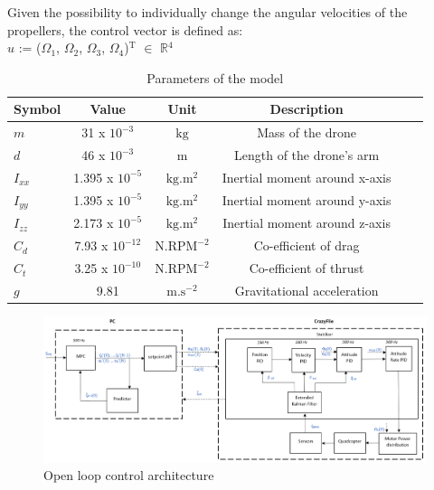 \documentclass[conference]{IEEEtran}
\begin{document}
Given the possibility to individually change the angular velocities of the propellers, the control vector is defined as: \\                          
$u$ := ($\Omega_{1}$, $\Omega_{2}$, $\Omega_{3}$, $\Omega_{4}$)$\mathrm{^{T}}$ $\in$ $\mathbb{R}\mathrm{^{4}}$

\begin{table}[htbp]\label{table1}
	\caption{Parameters of the model}
	\begin{center}
		\begin{tabular}{lccccl}\toprule
            \hline
			\textbf{Symbol} & \textbf{Value} & \textbf{Unit} & \textbf{Description}\\\midrule
			\hline
            $m$ & 31 x $\mathrm{10^{-3}}$ & $\mathrm{kg}$ & Mass of the drone \\
			$d$ & 46 x $\mathrm{10^{-3}}$ & $\mathrm{m}$ & Length of the drone's arm \\
			$I_{xx}$ & 1.395 x $\mathrm{10^{-5}}$ & $\mathrm{kg.m^2}$ & Inertial moment around x-axis \\
            $I_{yy}$ & 1.395 x $\mathrm{10^{-5}}$ & $\mathrm{kg.m^2}$ & Inertial moment around y-axis \\
            $I_{zz}$ & 2.173 x $\mathrm{10^{-5}}$ & $\mathrm{kg.m^2}$ & Inertial moment around z-axis \\
            $C_d$ & 7.93 x $\mathrm{10^{-12}}$ & $\mathrm{N.RPM^{-2}}$ & Co-efficient of drag\\
			$C_t$ & 3.25 x $\mathrm{10^{-10}}$ & $\mathrm{N.RPM^{-2}}$ & Co-efficient of thrust \\
			$g$ & 9.81 & $\mathrm{m.s^{-2}}$ & Gravitational acceleration \\\bottomrule
			\hline
		\end{tabular}
	\end{center}
\end{table}

\begin{figure}[htbp]
	\centerline{\includegraphics[scale = 0.6]{figures/Screenshot_OL.png} }
	\caption{Open loop control architecture }
	\label{Fig2}
\end{figure}
\end{document}
